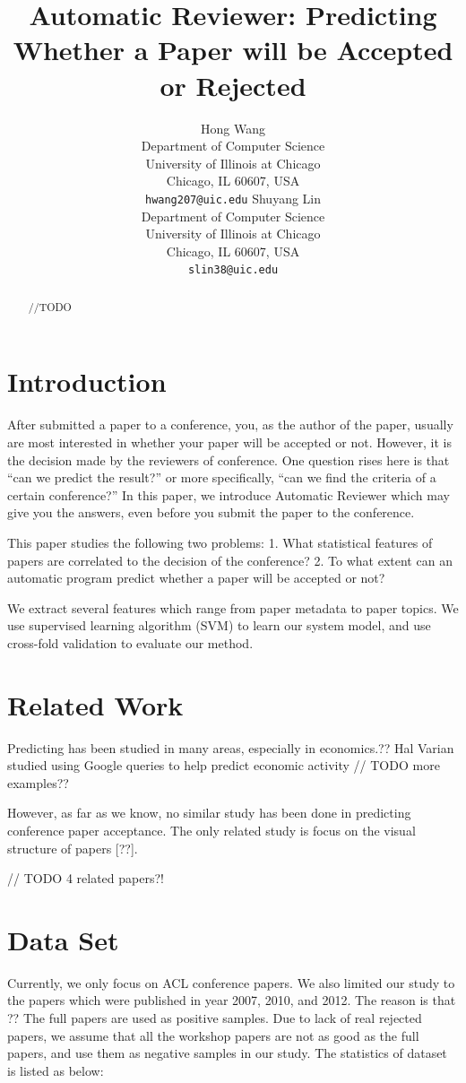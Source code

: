 \documentclass[11pt,letterpaper]{article}
\title{Automatic Reviewer: Predicting Whether a Paper will be Accepted or Rejected}
\author{Hong Wang\\
	    Department of Computer Science\\
	    University of Illinois at Chicago\\
	    Chicago, IL 60607, USA\\
	    {\tt hwang207@uic.edu}
	  \And
	Shuyang Lin\\
  	 Department of Computer Science\\
	    University of Illinois at Chicago\\
	    Chicago, IL 60607, USA\\
	  {\tt slin38@uic.edu}}
\date{}
\begin{document}
\maketitle
\begin{abstract}
	//TODO
\end{abstract}

\section{Introduction}
After submitted a paper to a conference, you, as the author of the paper, usually are most interested in whether your paper will be accepted or not.
However, it is the decision made by the reviewers of conference. 
One question rises here is that “can we predict the result?” or more specifically, “can we find the criteria of a certain conference?” 
In this paper, we introduce Automatic Reviewer which may give you the answers, even before you submit the paper to the conference. 

This paper studies the following two problems: 
1. What statistical features of papers are correlated to the decision of the conference? 
2. To what extent can an automatic program predict whether a paper will be accepted or not?

We extract several features which range from paper metadata to paper topics. 
We use supervised learning algorithm (SVM) to learn our system model, and use cross-fold validation to evaluate our method. 

\section{Related Work}

Predicting has been studied in many areas, especially in economics.?? Hal Varian studied using Google queries to help predict economic activity 
// TODO more examples??

However, as far as we know, no similar study has been done in predicting conference paper acceptance. The only related study is focus on the visual structure of papers [??]. 

// TODO 4 related papers?!



\section{Data Set}
Currently, we only focus on ACL conference papers. We also limited our study to the papers which were published in year 2007, 2010, and 2012. The reason is that ??
The full papers are used as positive samples. Due to lack of real rejected papers, we assume that all the workshop papers are not as good as the full papers, and use them as negative samples in our study. The statistics of dataset is listed as below: 
\end{document}
